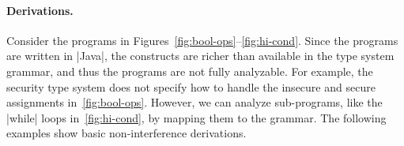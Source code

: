 \paragraph*{Derivations.} Consider the programs in Figures~\ref{fig:bool-ops}--\ref{fig:hi-cond}.
Since the programs are written in \pr|Java|,
the constructs are richer than available in the type system grammar, and thus the programs are not fully analyzable.
For example, the {security type system} 
does not specify how to handle the insecure and secure assignments in~\ref{fig:bool-ops}.
However, we can analyze sub-programs, like the \pr|while| loops in~\ref{fig:hi-cond}, by mapping them to the grammar.
The following examples show basic non-interference derivations.

